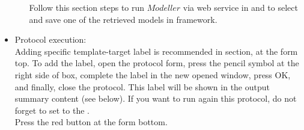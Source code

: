 \begin{itemize}
\begin{itemize}
  Follow this section steps to run $Modeller$ via web service in \chimera and to select and save one of the retrieved models in \scipion framework.\\
  
  \end{itemize}
  \item Protocol execution:\\
  
  Adding specific template-target label is recommended in  section, at the form top. To add the label, open the protocol form, press the pencil symbol at the right side of  box, complete the label in the new opened window, press OK, and finally, close the protocol. This label will be shown in the output summary content (see below). If you want to run again this protocol, do not forget to set to  the .\\
  Press the  red button at the form bottom.\\
  

\end{itemize}
